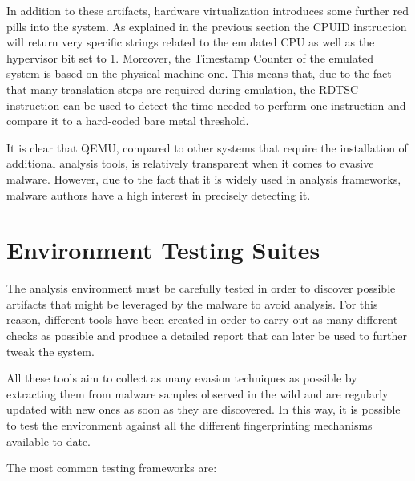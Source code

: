 In addition to these artifacts, hardware virtualization introduces some further red pills into the system. As explained in the previous section the CPUID instruction will return very specific strings related to the emulated CPU as well as the hypervisor bit set to 1. Moreover, the Timestamp Counter of the emulated system is based on the physical machine one. This means that, due to the fact that many translation steps are required during emulation, the RDTSC instruction can be used to detect the time needed to perform one instruction and compare it to a hard-coded bare metal threshold. 

It is clear that QEMU, compared to other systems that require the installation of additional analysis tools, is relatively transparent when it comes to evasive malware. However, due to the fact that it is widely used in analysis frameworks, malware authors have a high interest in precisely detecting it. 


\section{Environment Testing Suites}

The analysis environment must be carefully tested in order to discover possible artifacts that might be leveraged by the malware to avoid analysis. For this reason, different tools have been created in order to carry out as many different checks as possible and produce a detailed report that can later be used to further tweak the system.

All these tools aim to collect as many evasion techniques as possible by extracting them from malware samples observed in the wild and are regularly updated with new ones as soon as they are discovered. In this way, it is possible to test the environment against all the different fingerprinting mechanisms available to date. 

The most common testing frameworks are: 


